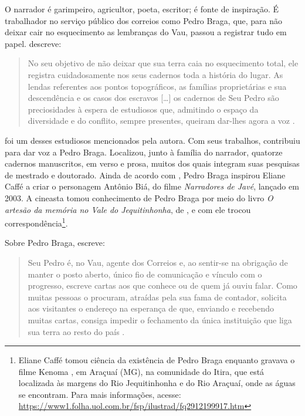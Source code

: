\documentclass[portuguese]{textolivre}
\begin{document}
O narrador é garimpeiro, agricultor, poeta, escritor; é fonte de inspiração. É trabalhador no serviço público dos correios como Pedro Braga, que, para não deixar cair no esquecimento as lembranças do Vau, passou a registrar tudo em papel. \textcite{Pereira1996} descreve:

\begin{quote}
No seu objetivo de não deixar que sua terra caia no esquecimento total, ele registra cuidadosamente nos seus cadernos toda a história do lugar. As lendas referentes aos pontos topográficos, as famílias proprietárias e sua descendência e os casos dos escravos […] os cadernos de Seu Pedro são preciosidades à espera de estudiosos que, admitindo o espaço da diversidade e do conflito, sempre presentes, queiram dar-lhes agora a voz \cite[p. 21]{Pereira1996}.
\end{quote}

\textcite{Souza2006} foi um desses estudiosos mencionados pela autora. Com seus trabalhos, contribuiu para dar voz a Pedro Braga. Localizou, junto à família do narrador, quatorze cadernos manuscritos, em verso e prosa, muitos dos quais integram suas pesquisas de mestrado e doutorado. Ainda de acordo com \textcite{Souza2018}, Pedro Braga inspirou Eliane Caffé a criar o personagem Antônio Biá, do filme \textit{Narradores de Javé}, lançado em 2003. A cineasta tomou conhecimento de Pedro Braga por meio do livro \textit{O artesão da memória no Vale do Jequitinhonha}, de \textcite{Pereira1996}, e com ele trocou correspondência\footnote{Eliane Caffé tomou ciência da existência de Pedro Braga enquanto gravava o filme Kenoma \cite{kenoma1998}, em Araçuaí (MG), na comunidade do Itira, que está localizada às margens do Rio Jequitinhonha e do Rio Araçuaí, onde as águas se encontram. Para mais informações, acesse: \url{https://www1.folha.uol.com.br/fsp/ilustrad/fq2912199917.htm}}.

Sobre Pedro Braga, \textcite{Pereira1996} escreve:

\begin{quote}
    Seu Pedro é, no Vau, agente dos Correios e, ao sentir-se na obrigação de manter o posto aberto, único fio de comunicação e vínculo com o progresso, escreve cartas aos que conhece ou de quem já ouviu falar. Como muitas pessoas o procuram, atraídas pela sua fama de contador, solicita aos visitantes o endereço na esperança de que, enviando e recebendo muitas cartas, consiga impedir o fechamento da única instituição que liga sua terra ao resto do país \cite[p. 30]{Pereira1996}.
\end{quote}
\end{document}
